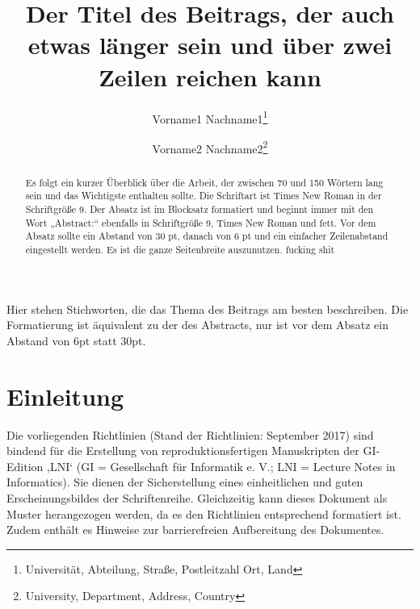 \documentclass[utf8,biblatex]{lni}
\begin{document}
\title[Ein Kurztitel]{Der Titel des Beitrags, der auch etwas länger sein und über zwei Zeilen reichen kann}
\author[Vorname1 Nachname1 \and Vorname2 Nachname2]
{Vorname1 Nachname1\footnote{Universität, Abteilung, Straße, Postleitzahl Ort, Land } \and
 Vorname2 Nachname2\footnote{University, Department, Address, Country }}
\maketitle

\begin{abstract}
Es folgt ein kurzer Überblick über die Arbeit, der zwischen 70 und 150 Wörtern lang sein und das Wichtigste enthalten sollte. Die Schriftart ist Times New Roman in der Schriftgröße 9. Der Absatz ist im Blocksatz formatiert und beginnt immer mit den Wort „Abstract:“ ebenfalls in Schriftgröße 9, Times New Roman und fett. Vor dem Absatz sollte ein Abstand von 30 pt, danach von 6 pt und ein einfacher Zeilenabstand eingestellt werden. Es ist die ganze Seitenbreite auszunutzen. fucking shit
\end{abstract}

\begin{keywords}
Hier stehen Stichworten, die das Thema des Beitrags am besten beschreiben. Die Formatierung ist äquivalent zu der des Abstracts, nur ist vor dem Absatz ein Abstand von 6pt statt 30pt.
\end{keywords}

\section{Einleitung}
Die vorliegenden Richtlinien (Stand der Richtlinien: September 2017) sind bindend für die Erstellung von reproduktionsfertigen Manuskripten der GI-Edition ‚LNI‘ (GI = Gesellschaft für Informatik e. V.; LNI = Lecture Notes in Informatics). Sie dienen der Sicherstellung eines einheitlichen und guten Erscheinungsbildes der Schriftenreihe. Gleichzeitig kann dieses Dokument als Muster herangezogen werden, da es den Richtlinien entsprechend formatiert ist. Zudem enthält es Hinweise zur barrierefreien Aufbereitung des Dokumentes.
\end{document}
